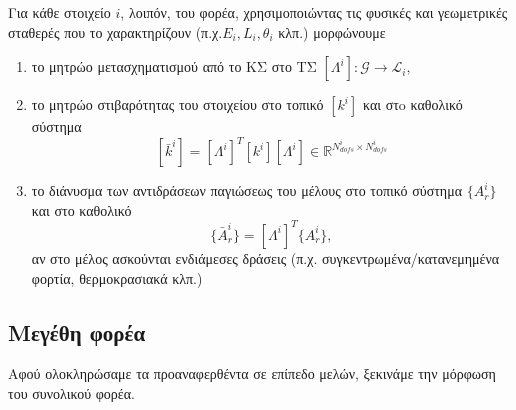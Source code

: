 \documentclass[a4paper, twocolumn]{article}
\newcommand{\num}[1]{ N_{\mathit{#1}} }
\newcommand{\gs}{\mathcal{G}}
\newcommand{\ls}{\mathcal{L}_i}
\newcommand{\vect}[1]{ \{ #1\} }
\newcommand{\mat}[1]{\left[ #1 \right]}
\newcommand{\gtol}{\mat{\Lambda^i}}
\newcommand{\lstiff}[1]{\mat{k^{\mathit{#1}}}}
\newcommand{\gstiff}[1]{\mat{\bar{k}^{\mathit{#1}}}}
\begin{document}
Για κάθε στοιχείο $i$, λοιπόν, του 
φορέα, χρησιμοποιώντας τις φυσικές και γεωμετρικές σταθερές που το 
χαρακτηρίζουν (π.χ.$E_i, L_i, \theta_i$ κλπ.) μορφώνουμε
\begin{enumerate}
	\item το μητρώο μετασχηματισμού από το ΚΣ στο ΤΣ
	$ \gtol: \gs \rightarrow \ls ,$
	\item το μητρώο στιβαρότητας του στοιχείου στο τοπικό 
	$\lstiff{i}$ και
 	στo καθολικό σύστημα
		\begin{equation}
			\gstiff i = \gtol^T \lstiff{i} \gtol \in 
			\mathbb{R}^{\num{dofs}^i \times \num{dofs}^i}
		\end{equation}

	\item το διάνυσμα των αντιδράσεων παγιώσεως του μέλους στο τοπικό 
	σύστημα $\vect{A_r^i} $ και στο καθολικό 
	\begin{equation}
		\vect{\bar A_r^i} = \gtol^T \vect{A_r^i},
	\end{equation}
	αν στο μέλος ασκούνται ενδιάμεσες δράσεις (π.χ. 
	συγκεντρωμένα/κατανεμημένα φορτία, θερμοκρασιακά κλπ.)

\end{enumerate}



\subsection{Μεγέθη φορέα}
Αφού ολοκληρώσαμε τα προαναφερθέντα σε επίπεδο μελών, ξεκινάμε την 
μόρφωση του συνολικού φορέα.
\end{document}
